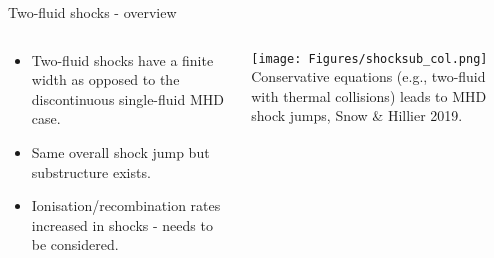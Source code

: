 \documentclass[10pt,aspectratio=169,usenames,dvipsnames]{beamer}
\begin{document}
\begin{frame}{Two-fluid shocks - overview}
\begin{columns}
\begin{column}{0.4\textwidth}
\begin{itemize}
    \item Two-fluid shocks have a finite width as opposed to the discontinuous single-fluid MHD case.
    \item Same overall shock jump but substructure exists.
    \item Ionisation/recombination rates increased in shocks - needs to be considered.
\end{itemize}
\end{column}
\begin{column}{0.6\textwidth}
\texttt{[image: Figures/shocksub\_col.png]} \\
Conservative equations (e.g., two-fluid with thermal collisions) leads to MHD shock jumps, Snow \& Hillier 2019.
\end{column}
\end{columns}
\end{frame}
\end{document}
